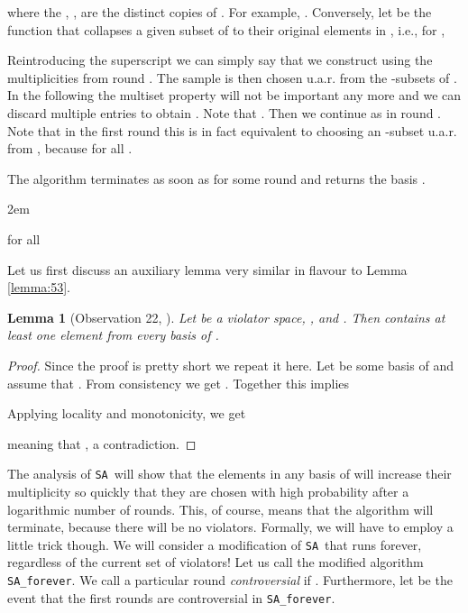 \documentclass[12pt]{article}
\newtheorem{lemma2}[theorem2]{Lemma}
\newenvironment{lemma}{\begin{lemma2}}{\end{lemma2}}
\theoremstyle{remark}
\def\stageII{\texttt{SA}}
\def\stageIIforever{\texttt{SA\_forever}}
\def\stageIII{\texttt{BFA}}
\begin{document}
 
where the , , are the distinct copies of . For example, .
Conversely, let  be the  function that collapses a given subset
of  to their original elements in , i.e., for ,


Reintroducing the superscript  we can simply say that we construct 
using the multiplicities from round .
The sample  is then chosen u.a.r. from the -subsets of
. In the following the multiset property will not be important any more and we
can discard multiple entries to obtain . Note that .
Then we continue as in round . Note that in the first round this is in fact equivalent
to choosing an -subset u.a.r. from , because  for all .

The algorithm terminates as soon as  for some round  and
returns the basis .

{
\parskip2em
\begin{algorithm}[H]
	\Indp
	\SetInd{0.5cm}{0em}
	\BlankLine
			 for all \;
			\;
			\Repeat{}{
				choose random  from  according to \;
				 \stageIII()\;
				 for all \;
			}
		\Return{}
	\BlankLine
    \caption{\stageII()\label{stageII}}
    \end{algorithm}


Let us first discuss an auxiliary lemma very similar in flavour to Lemma \ref{lemma:53}.
}

\begin{lemma}[Observation 22,  \cite{journals/dam/GartnerMRS08}]
\label{lemma:53b}
Let  be a violator space, , and .
Then  contains at least one element from every basis of .
\end{lemma}
\begin{proof}
Since the proof is pretty short we repeat it here.
Let  be some basis of  and assume that . From consistency we get
. Together this implies

Applying locality and monotonicity, we get

meaning that , a contradiction.
\end{proof}

The analysis of \stageII~will show that the elements in any basis  of
 will increase their multiplicity so quickly
that they are chosen with high probability after a logarithmic number
of rounds. This, of course, means that the algorithm will terminate, because there will be no violators.
Formally, we will have to employ a little trick though. We will consider a modification
of \stageII~that runs forever, regardless of the current set of violators! Let us call the modified algorithm \stageIIforever. We call a particular round  \emph{controversial} if
. Furthermore, let  be the event that the first   rounds are controversial
 in \stageIIforever.
\end{document}
